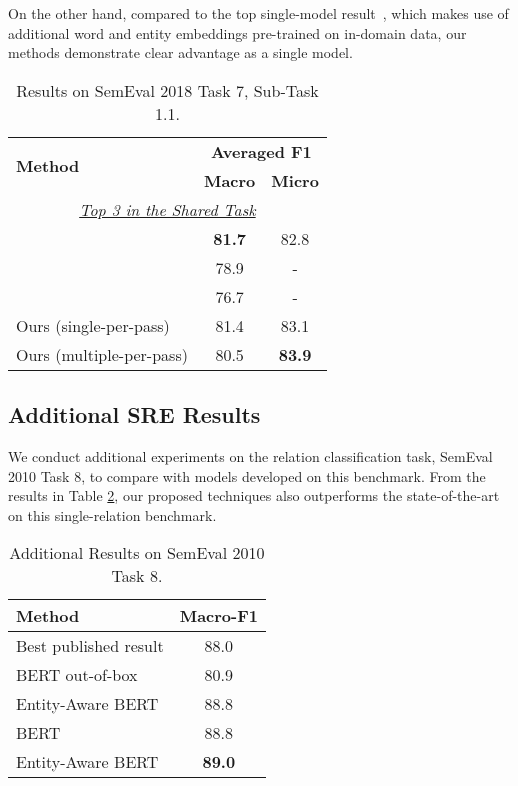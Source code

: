 \documentclass[11pt,a4paper]{article}
\begin{document}
On the other hand, compared to the top single-model result~\cite{luan-etal-2018-uwnlp}, which makes use of additional word and entity embeddings pre-trained on in-domain data, our methods demonstrate clear advantage as a single model. 

\begin{table}[!t]
\small
\centering
\begin{tabular}{lcc}
\toprule
\multirow{2}{*}{\textbf{Method}} &
\multicolumn{2}{c}{\textbf{Averaged F1}} \\ 
& \textbf{Macro}& \textbf{Micro} \\
\midrule
\multicolumn{3}{c}{\underline{\emph{Top 3 in the Shared Task}}}\\
\cite{rotsztejn-etal-2018-eth} & \bf 81.7 & 82.8\\
\cite{luan-etal-2018-uwnlp} & 78.9 & -\\
\cite{nooralahzadeh-etal-2018-sirius} & 76.7 & -\\
\midrule
Ours (single-per-pass) & 81.4 & 83.1 \\
Ours (multiple-per-pass) & 80.5 & \bf 83.9 \\
\bottomrule
\end{tabular}
\caption{\small Results on SemEval 2018 Task 7, Sub-Task 1.1.}
\label{tab:semeval2018}
\end{table}

\subsection{Additional SRE Results}
We conduct additional experiments on the relation classification task, SemEval 2010 Task 8, to compare with models developed on this benchmark.
From the results in Table \ref{tab:semeval2010}, our proposed techniques also outperforms the state-of-the-art on this single-relation benchmark.

\begin{table}[!t]
\small
\centering
\begin{tabular}{lc}
\toprule
\multicolumn{1}{l}{\textbf{Method}} & \textbf{Macro-F1} \\ \midrule
Best published result \cite{wang2016relation} & 88.0\\
\midrule
BERT out-of-box                      & 80.9         \\
Entity-Aware BERT & 88.8         \\
BERT & 88.8         \\
Entity-Aware BERT & \bf 89.0         \\ 
\bottomrule
\end{tabular}
\caption{\small Additional Results on SemEval 2010 Task 8.}
\label{tab:semeval2010}
\end{table}
\end{document}

